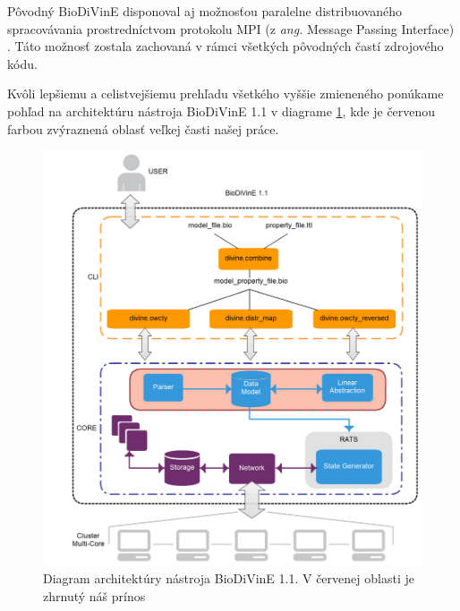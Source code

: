 \documentclass[11pt,final,oneside]{fithesis}
\begin{document}
P\^ ovodn\'y BioDiVinE disponoval aj mo\v znos\v tou paralelne distribuovan\'eho spracov\'avania prostredn\'ictvom protokolu MPI (z \textit{ang.} Message 
Passing Interface) \cite{MPI}. T\'ato mo\v znos\v t zostala zachovan\'a v r\'amci v\v setk\'ych p\^ ovodn\'ych \v cast\'i zdrojov\'eho k\'odu.

Kv\^ oli lep\v siemu a celistvej\v siemu preh\v ladu v\v setk\'eho vy\v s\v sie zmienen\'eho pon\'ukame poh\v lad na architekt\'uru n\'astroja BioDiVinE 1.1 
v diagrame \ref{fig:diagram}, kde je \v cervenou farbou zv\'yraznen\'a oblas\v t ve\v lkej \v casti na\v sej pr\'ace.

\begin{figure}[h]
\label{fig:diagram}
\centering
\includegraphics[width=1\textwidth]{BiodivineArchitecture2.pdf}
\caption{Diagram architekt\'ury n\'astroja BioDiVinE 1.1. V \v cervenej oblasti je zhrnut\'y n\'a\v s pr\'inos}
\end{figure}

\end{document}
